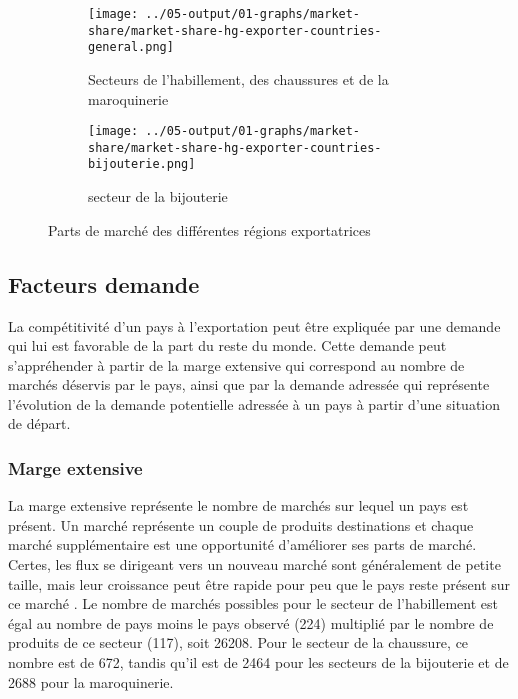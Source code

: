 \documentclass[french,10pt,a4paper]{article}
\begin{document}
\begin{figure}[!h]
  \centering
  \begin{subfigure}{\textwidth}
    \centering    
    \texttt{[image: ../05-output/01-graphs/market-share/market-share-hg-exporter-countries-general.png]}
    \caption{Secteurs de l'habillement, des chaussures et de la maroquinerie}
    \label{fig:market-share-hg-exporter-countries-general}
  \end{subfigure}
  \vspace{0.5cm}
  \begin{subfigure}{\textwidth}
    \centering \texttt{[image: ../05-output/01-graphs/market-share/market-share-hg-exporter-countries-bijouterie.png]}
 \caption{secteur de la bijouterie}
 \label{fig:market-share-hg-exporter-countries-bijouterie}
  \end{subfigure}
  \caption{Parts de marché des différentes régions exportatrices}
  \label{fig:market-share}
\end{figure}


\subsection{Facteurs demande}

La compétitivité d'un pays à l'exportation peut être expliquée par une demande qui lui est favorable de la part du reste du monde. Cette demande peut s'appréhender à partir de la marge extensive qui correspond au nombre de marchés déservis par le pays, ainsi que par la demande adressée qui représente l'évolution de la demande potentielle adressée à un pays à partir d'une situation de départ.

\subsubsection{Marge extensive}


La marge extensive représente le nombre de marchés sur lequel un pays est présent. Un marché représente un couple de produits destinations et chaque marché supplémentaire est une opportunité d'améliorer ses parts de marché. Certes, les flux se dirigeant vers un nouveau marché sont généralement de petite taille, mais leur croissance peut être rapide pour peu que le pays reste présent sur ce marché \cite{Bas2015}. Le nombre de marchés possibles pour le secteur de l'habillement est égal au nombre de pays moins le pays observé (224) multiplié par le nombre de produits de ce secteur (117), soit 26208. Pour le secteur de la chaussure, ce nombre est de 672, tandis qu'il est de 2464 pour les secteurs de la bijouterie et de 2688 pour la maroquinerie.
\end{document}
